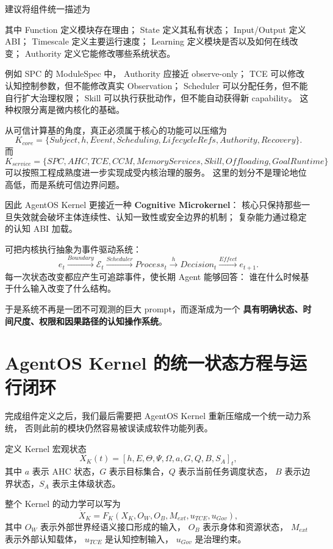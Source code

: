 建议将组件统一描述为
\begin{statementbox}
\centering
{}
\end{statementbox}
其中 Function 定义模块存在理由；
State 定义其私有状态；
Input/Output 定义 ABI；
Timescale 定义主要运行速度；
Learning 定义模块是否以及如何在线改变；
Authority 定义它能修改哪些系统状态。

例如 SPC 的 ModuleSpec 中，
Authority 应接近 observe-only；
TCE 可以修改认知控制参数，但不能修改真实 Observation；
Scheduler 可以分配任务，但不能自行扩大治理权限；
Skill 可以执行获批动作，但不能自动获得新 capability。
这种权限分离是微内核化的基础。

从可信计算基的角度，真正必须属于核心的功能可以压缩为
\[
K_{core}
=
\{
Subject,
h,
Event,
Scheduling,
LifecycleRefs,
Authority,
Recovery
\}.
\]
而
\[
K_{service}
=
\{
SPC,
AHC,
TCE,
CCM,
MemoryServices,
Skill,
Offloading,
GoalRuntime
\}
\]
可以按照工程成熟度进一步实现成受内核治理的服务。
这里的划分不是理论地位高低，而是系统可信边界问题。

因此 AgentOS Kernel 更接近一种
\textbf{Cognitive Microkernel}：
核心只保持那些一旦失效就会破坏主体连续性、认知一致性或安全边界的机制；
复杂能力通过稳定的认知 ABI 加载。

可把内核执行抽象为事件驱动系统：
\[
e_t
\xrightarrow{Boundary}
\mathcal E_t
\xrightarrow{Scheduler}
Process_t
\xrightarrow{h}
Decision_t
\xrightarrow{Effect}
e_{t+1}.
\]
每一次状态改变都应产生可追踪事件，使长期 Agent 能够回答：
谁在什么时候基于什么输入改变了什么结构。

于是系统不再是一团不可观测的巨大 prompt，而逐渐成为一个
\textbf{具有明确状态、时间尺度、权限和因果路径的认知操作系统}。


\section{AgentOS Kernel 的统一状态方程与运行闭环}

完成组件定义之后，我们最后需要把 AgentOS Kernel 重新压缩成一个统一动力系统，
否则此前的模块仍然容易被误读成软件功能列表。

定义 Kernel 宏观状态
\[
X_K(t)
=
\left[
h,
E,
\Theta,
\Psi,
\Omega,
a,
G,
Q,
B,
S_A
\right]_t,
\]
其中 $a$ 表示 AHC 状态，$G$ 表示目标集合，$Q$ 表示当前任务调度状态，
$B$ 表示边界状态，$S_A$ 表示主体级状态。

整个 Kernel 的动力学可以写为
\[
\dot X_K
=
F_K
\left(
X_K,
O_W,
O_B,
M_{ext},
u_{TCE},
u_{Gov}
\right),
\]
其中 $O_W$ 表示外部世界经语义接口形成的输入，
$O_B$ 表示身体和资源状态，
$M_{ext}$ 表示外部认知载体，
$u_{TCE}$ 是认知控制输入，
$u_{Gov}$ 是治理约束。


